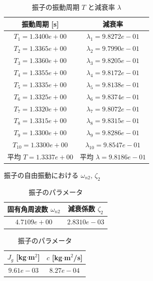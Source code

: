 \begin{table}[h]
  \centering
  \caption{振子の振動周期 $T$ と減衰率 $\lambda$}
  \begin{tabular}{|c|c|}
    \hline
    振動周期 [s]          & 減衰率                      \\
    \hline
    $T_1 = 1.3400e+00$    & $\lambda_1 = 9.8272e-01$    \\
    \hline
    $T_2 = 1.3365e+00$    & $\lambda_2 = 9.7990e-01$    \\
    \hline
    $T_3 = 1.3360e+00$    & $\lambda_3 = 9.8205e-01$    \\
    \hline
    $T_4 = 1.3355e+00$    & $\lambda_4 = 9.8172e-01$    \\
    \hline
    $T_5 = 1.3335e+00$    & $\lambda_5 = 9.8138e-01$    \\
    \hline
    $T_6 = 1.3325e+00$    & $\lambda_6 = 9.8374e-01$    \\
    \hline
    $T_7 = 1.3320e+00$    & $\lambda_7 = 9.8072e-01$    \\
    \hline
    $T_8 = 1.3315e+00$    & $\lambda_8 = 9.8315e-01$    \\
    \hline
    $T_9 = 1.3300e+00$    & $\lambda_9 = 9.8286e-01$    \\
    \hline
    $T_{10} = 1.3300e+00$ & $\lambda_{10} = 9.8547e-01$ \\
    \hline
    平均 $T = 1.3337e+00$ & 平均 $\lambda = 9.8186e-01$ \\
    \hline
  \end{tabular}
\end{table}

\begin{table}[h]
  \centering
  \begin{minipage}{0.45\linewidth}
    \centering
    \caption{振子の自由振動における $\omega_{n2}$, $\zeta_2$}
    \begin{tabular}{|c|c|}
      \hline
      固有角周波数 $\omega_{n2}$ & 減衰係数 $\zeta_2$ \\
      \hline
      $4.7109e+00$               & $2.8310e-03$       \\
      \hline
    \end{tabular}
  \end{minipage}%
  \hfill
  \begin{minipage}{0.45\linewidth}
    \centering
    \caption{振子のパラメータ}
    \begin{tabular}{|c|c|}
      \hline
      $J_g$ [kg$\cdot$m$^2$] & $c$ [kg$\cdot$m$^2$/s] \\
      \hline
      $9.61e-03$             & $8.27e-04$             \\
      \hline
    \end{tabular}
  \end{minipage}
\end{table}

